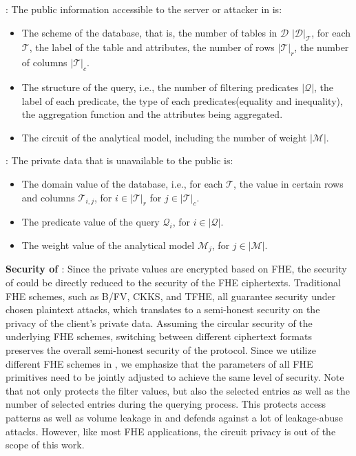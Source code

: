 : The public information accessible to the 
server or attacker in \NAME is: 
\begin{itemize}
    \item The scheme of the database, that is, 
    the number of tables in $\mathcal{D}$
    $\lvert \mathcal{D} \rvert _{\mathcal{T}}$, 
    for each $\mathcal{T}$, 
    the label of the table and attributes, 
    the number of rows $\lvert \mathcal{T} \rvert _{r}$, 
    the number of columns $\lvert \mathcal{T} \rvert _{c}$.
    \item The structure of the query, i.e., 
    the number of filtering predicates
    $\lvert \mathcal{Q} \rvert $,
    the label of each predicate, 
    the type of each predicates(equality and inequality),
    the aggregation function and the attributes being aggregated. 
    \item The circuit of the analytical model,
    including the number of weight $\lvert \mathcal{M} \rvert$.
\end{itemize}

: The private data that is unavailable to the 
public is: 
\begin{itemize}
    \item The domain value of the database, i.e.,  
    for each $\mathcal{T}$, 
    the value in certain rows and columns 
    $\mathcal{T}_{i, j}$, 
    for $i \in \lvert \mathcal{T} \rvert _{r}$
    for $j \in \lvert \mathcal{T} \rvert _{c}$.
    \item The predicate value of the query
    $\mathcal{Q}_{i}$, for $i \in \lvert \mathcal{Q} \rvert$. 
    \item The weight value of the analytical model 
    $\mathcal{M}_{j}$, for $j \in \lvert \mathcal{M} \rvert$.
\end{itemize}

{\bf{Security of \NAME}}: Since the private values are encrypted based 
on FHE, the security of \NAME could be directly 
reduced to the security of the FHE ciphertexts.
Traditional FHE schemes, such as B/FV, CKKS, and TFHE, 
all guarantee security under chosen plaintext attacks, 
which translates to a semi-honest security 
on the privacy of the client's private data. 
Assuming the circular security of the underlying FHE schemes, 
switching between different ciphertext formats preserves 
the overall semi-honest security of the protocol.
Since we utilize different FHE schemes in \NAME, 
we emphasize that the parameters of all 
FHE primitives need to be jointly 
adjusted to achieve the same level of security. 
Note that \NAME not only protects the filter values,
but also the selected entries 
as well as the number of selected entries 
during the querying process.
This protects access patterns as well as volume leakage in \NAME
and defends against a lot of leakage-abuse attacks\cite{...}.
However, like most FHE applications, 
the circuit privacy is out of the scope of this work.  

